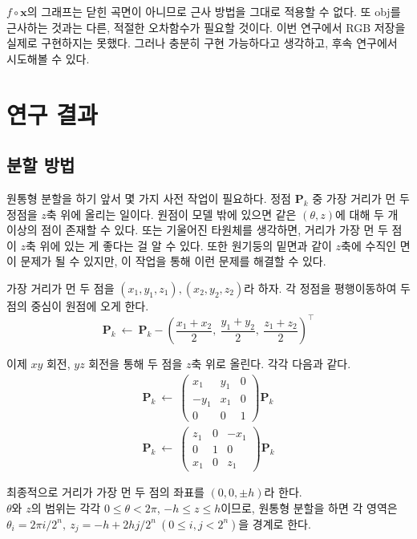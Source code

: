 \documentclass[10pt]{gshs-report-v2.0}
\theoremstyle{theorem}
\theoremstyle{lemma}
\theoremstyle{definition}
\begin{document}
$f\circ\mathbf{x}$의 그래프는 닫힌 곡면이 아니므로 근사 방법을 그대로 적용할 수 없다. 또 obj를 근사하는 것과는 다른, 적절한 오차함수가 필요할 것이다. 이번 연구에서 RGB 저장을 실제로 구현하지는 못했다. 그러나 충분히 구현 가능하다고 생각하고, 후속 연구에서 시도해볼 수 있다. 

\section{연구 결과}

\subsection{분할 방법} \label{3.1}
원통형 분할을 하기 앞서 몇 가지 사전 작업이 필요하다. 정점 $\mathbf{P}_k$ 중 가장 거리가 먼 두 정점을 $z$축 위에 올리는 일이다. 원점이 모델 밖에 있으면 같은 $(\theta, z)$에 대해 두 개 이상의 점이 존재할 수 있다. 또는 기울어진 타원체를 생각하면, 거리가 가장 먼 두 점이 $z$축 위에 있는 게 좋다는 걸 알 수 있다. 또한 원기둥의 밑면과 같이 $z$축에 수직인 면이 문제가 될 수 있지만, 이 작업을 통해 이런 문제를 해결할 수 있다. 

가장 거리가 먼 두 점을 $(x_1, y_1, z_1), (x_2, y_2, z_2)$라 하자. 각 정점을 평행이동하여 두 점의 중심이 원점에 오게 한다. 
\begin{equation*}
	\mathbf{P}_k\ \leftarrow\ \mathbf{P}_k - \left(\frac{x_1+x_2}2,\ \frac{y_1+y_2}2,\ \frac{z_1+z_2}2\right)^\intercal
\end{equation*}

이제 $xy$ 회전, $yz$ 회전을 통해 두 점을 $z$축 위로 올린다. 각각 다음과 같다. 
\begin{align*}
	\mathbf{P}_k\ \leftarrow\ \begin{pmatrix}
		x_1 & y_1 & 0 \\ -y_1 & x_1 & 0 \\ 0 & 0 & 1
	\end{pmatrix} \mathbf{P}_k \\
	\mathbf{P}_k\ \leftarrow\ \begin{pmatrix}
		z_1 & 0 & -x_1 \\ 0 & 1 & 0 \\ x_1 & 0 & z_1
	\end{pmatrix} \mathbf{P}_k
\end{align*}

최종적으로 거리가 가장 먼 두 점의 좌표를 $(0, 0, \pm h)$라 한다. \\

$\theta$와 $z$의 범위는 각각 $0\leq \theta <2\pi$, $-h \leq z \leq h$이므로, 원통형 분할을 하면 각 영역은 $\theta_i=2\pi i/2^n,\ z_j=-h+2hj/2^n\ (0\leq i, j < 2^n)$을 경계로 한다. 
\end{document}
